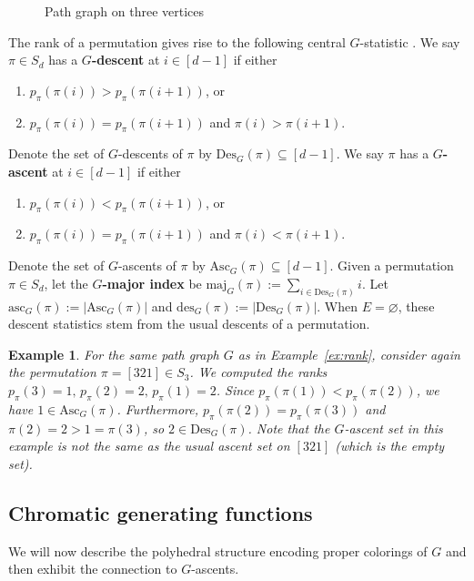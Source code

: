 \documentclass[11pt]{amsart}
\newtheorem{exam}{Example}
\newenvironment{example}{\begin{exam}\sf}{\end{exam}}
\newcommand\Def[1]{{\bf #1}}
\newcommand{\rk}[1][\pi]{p_{#1}}
\newcommand{\maj}{\mathrm{maj}}
\newcommand{\des}{\mathrm{Des}}
\newcommand{\asc}{\mathrm{Asc}}
\newcommand{\desnum}{\mathrm{des}}
\newcommand{\ascnum}{\mathrm{asc}}
\begin{document}
\begin{figure}
    \centering
    
    \caption{Path graph on three vertices}
    \label{fig:rankgraphexample}
\end{figure}

The rank of a permutation gives rise to the following central $G$-statistic \cite{chunggrahamcoverpol}. 
We say $\pi \in S_d$ has a \Def{$G$-descent} at $i \in [d-1]$ if either
\begin{enumerate}
    \item $\rk(\pi(i)) > \rk(\pi(i+1))$, or 
    \item $\rk(\pi(i)) = \rk(\pi(i+1))$ and $\pi(i) > \pi(i+1)$.
\end{enumerate}
Denote the set of $G$-descents of $\pi$ by $\des_G(\pi) \subseteq [d-1]$. We say $\pi$ has a \Def{$G$-ascent} at $i \in [d-1]$ if either
\begin{enumerate}
    \item $\rk(\pi(i)) < \rk(\pi(i+1))$, or 
    \item $\rk(\pi(i)) = \rk(\pi(i+1))$ and $\pi(i) < \pi(i+1)$.
\end{enumerate}
Denote the set of $G$-ascents of $\pi$ by $\asc_G(\pi) \subseteq [d-1]$. 
Given a permutation $\pi \in S_d$, let the \Def{$G$-major index} be $\maj_G(\pi) := \sum_{i \in \des_G(\pi)} i$. 
Let $\ascnum_G(\pi) := |\asc_G(\pi)|$ and $\desnum_G(\pi):= |\des_G(\pi)|$.
When $E = \varnothing$, these descent statistics stem from the usual descents of a permutation.

\begin{example}
    For the same path graph $G$ as in Example~\ref{ex:rank}, consider again the permutation $\pi = [321] \in S_3$. 
    We computed the ranks $\rk(3)=1, \, \rk(2)=2, \, \rk(1)=2$. 
    Since $\rk(\pi(1)) < \rk(\pi(2))$, we have $1 \in \asc_G(\pi)$. 
    Furthermore, $\rk(\pi(2))=\rk(\pi(3))$ and $\pi(2)=2 > 1 = \pi(3)$, so $2 \in \des_G(\pi)$. 
    Note that the $G$-ascent set in this example is not the same as the usual ascent set on $[321]$ (which is
the empty set).
\end{example}

\subsection{Chromatic generating functions}
We will now describe the polyhedral structure encoding proper colorings of $G$ and then exhibit the connection to $G$-ascents. 
\end{document}
